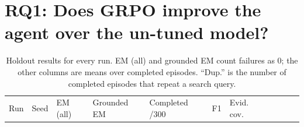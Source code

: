 \section{RQ1: Does GRPO improve the agent over the un-tuned
model?}\label{sec:4.3}

\begin{longtable}[]{@{}
  >{\raggedright\arraybackslash}p{}
  >{\raggedright\arraybackslash}p{}
  >{\raggedright\arraybackslash}p{}
  >{\raggedright\arraybackslash}p{}
  >{\raggedright\arraybackslash}p{}
  >{\raggedright\arraybackslash}p{}
  >{\raggedright\arraybackslash}p{}
  >{\raggedright\arraybackslash}p{}
  >{\raggedright\arraybackslash}p{}
  >{\raggedright\arraybackslash}p{}
  >{\raggedright\arraybackslash}p{}@{}}
\caption{Holdout results for every run. EM (all) and grounded EM count
failures as 0; the other columns are means over completed episodes.
``Dup.'' is the number of completed episodes that repeat a search
query.}\label{tbl:4.1}\tabularnewline
\toprule\noalign{}
\begin{minipage}[b]{\linewidth}\raggedright
Run
\end{minipage} & \begin{minipage}[b]{\linewidth}\raggedright
Seed
\end{minipage} & \begin{minipage}[b]{\linewidth}\raggedright
EM (all)
\end{minipage} & \begin{minipage}[b]{\linewidth}\raggedright
Grounded EM
\end{minipage} & \begin{minipage}[b]{\linewidth}\raggedright
Completed /300
\end{minipage} & \begin{minipage}[b]{\linewidth}\raggedright
F1
\end{minipage} & \begin{minipage}[b]{\linewidth}\raggedright
Evid. cov.
\end{minipage} & \begin{minipage}[b]{\linewidth}\raggedright

\end{minipage}
\end{longtable}
